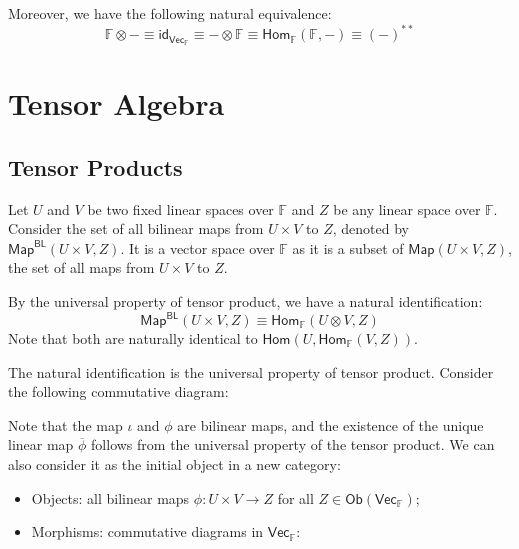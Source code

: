\documentclass[
	11pt, %
	fleqn, %
	a4paper, %
]{LegrandOrangeBook}
\newcommand{\Hom}{\mathsf{Hom}} %
\renewcommand{\bar}[1]{\overline{#1}} %
\newcommand{\F}{\mathbb{F}} %
\newcommand{\Map}{\mathsf{Map}} %
\newcommand{\id}{\mathsf{id}} %
\newcommand{\Vect}{\boldsymbol{\mathsf{Vec}}} %
\newcommand{\Ob}[1]{\mathsf{Ob}(#1)} %
\newcommand{\BL}{\mathsf{BL}} %
\begin{document}
Moreover, we have the following natural equivalence:
\[
    \F \otimes - \equiv \id_{\Vect_{\F}} \equiv - \otimes \F \equiv \Hom_{\F}(\F, -) \equiv (-)^{**}
\]

\chapter{Tensor Algebra}

\section{Tensor Products}

Let $U$ and $V$ be two fixed linear spaces over $\F$ and $Z$ be any linear space over $\F$. Consider the set of all bilinear maps from $U \times V$ to $Z$, denoted by $\Map^{\BL}(U \times V, Z)$. It is a vector space over $\F$ as it is a subset of $\Map(U \times V, Z)$, the set of all maps from $U \times V$ to $Z$.

By the universal property of tensor product, we have a natural identification:
\[
    \Map^{\BL}(U \times V, Z) \equiv \Hom_{\F}(U \otimes V, Z)
\]
Note that both are naturally identical to $\Hom(U, \Hom_{\F}(V, Z))$.

The natural identification is the universal property of tensor product. Consider the following commutative diagram:
\begin{center}
\end{center}
Note that the map $\iota$ and $\phi$ are bilinear maps, and the existence of the unique linear map $\bar{\phi}$ follows from the universal property of the tensor product. We can also consider it as the initial object in a new category:
\begin{itemize}
    \item Objects: all bilinear maps $\phi : U \times V \to Z$ for all $Z \in \Ob{\Vect_{\F}}$;
    \item Morphisms: commutative diagrams in $\Vect_{\F}$:
\end{itemize}
\begin{center}
\end{center}
\end{document}
